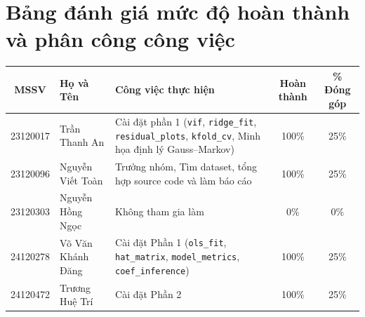 \section*{Bảng đánh giá mức độ hoàn thành và phân công công việc}

\begin{table}[H]
    \centering
    \renewcommand{\arraystretch}{1.5} %
    \begin{tabular}{|c|l|p{5cm}|c|c|}
    \hline
    \textbf{MSSV} & \textbf{Họ và Tên} & \textbf{Công việc thực hiện} & \textbf{Hoàn thành} & \textbf{\% Đóng góp} \\ \hline
    23120017 & Trần Thanh An & Cài đặt phần 1 (\texttt{vif}, \texttt{ridge\_fit}, \texttt{residual\_plots}, \texttt{kfold\_cv}, Minh họa định lý Gauss–Markov) & 100\% & 25\% \\ \hline
    23120096 & Nguyễn Viết Toàn & Trưởng nhóm, Tìm dataset, tổng hợp source code và làm báo cáo & 100\% & 25\% \\ \hline
    23120303 & Nguyễn Hồng Ngọc & Không tham gia làm & 0\% & 0\% \\ \hline
    24120278 & Võ Văn Khánh Đăng & Cài đặt Phần 1 (\texttt{ols\_fit}, \texttt{hat\_matrix}, \texttt{model\_metrics}, \texttt{coef\_inference}) & 100\% & 25\% \\ \hline
    24120472 & Trương Huệ Trí & Cài đặt Phần 2  & 100\% & 25\% \\ \hline
    \end{tabular}
\end{table}
\pagebreak